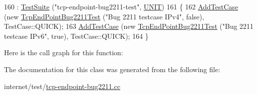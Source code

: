 \begin{DoxyCode}
160                                  : \hyperlink{classns3_1_1TestSuite_a904b0c40583b744d30908aeb94636d1a}{TestSuite} (\textcolor{stringliteral}{"tcp-endpoint-bug2211-test"}, 
      \hyperlink{classns3_1_1TestSuite_a1ebfcab34ec8161e085e8e3a1855eae0a3885375a3787abf60431f8454b3cadbd}{UNIT})
161   \{
162     \hyperlink{classns3_1_1TestCase_a3718088e3eefd5d6454569d2e0ddd835}{AddTestCase} (\textcolor{keyword}{new} \hyperlink{classTcpEndPointBug2211Test}{TcpEndPointBug2211Test} (\textcolor{stringliteral}{"Bug 2211 testcase IPv4"}, \textcolor{keyword}{
      false}), TestCase::QUICK);
163     \hyperlink{classns3_1_1TestCase_a3718088e3eefd5d6454569d2e0ddd835}{AddTestCase} (\textcolor{keyword}{new} \hyperlink{classTcpEndPointBug2211Test}{TcpEndPointBug2211Test} (\textcolor{stringliteral}{"Bug 2211 testcase IPv6"}, \textcolor{keyword}{
      true}), TestCase::QUICK);
164   \}
\end{DoxyCode}


Here is the call graph for this function\+:




The documentation for this class was generated from the following file\+:\begin{DoxyCompactItemize}
\item 
internet/test/\hyperlink{tcp-endpoint-bug2211_8cc}{tcp-\/endpoint-\/bug2211.\+cc}\end{DoxyCompactItemize}
